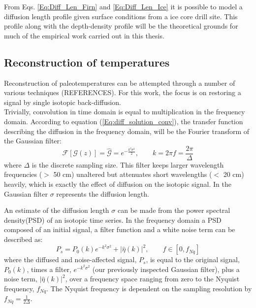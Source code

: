 \documentclass[../../CompleteThesis2/Complete_2ndDraft]{subfiles}
\begin{document}
From Eqs. \ref{Eq:Diff_Len_Firn} and \ref{Eq:Diff_Len_Ice} it is possible to model a diffusion length profile given surface conditions from a ice core drill site. This profile along with the depth-density profile will be the theoretical grounds for much of the empirical work carried out in this thesis.

\subsection{Reconstruction of temperatures}
\label{Subsec:Ice_DiffusionAndDensification_Diffusion_TemperatureRecon}
Reconstruction of paleotemperatures can be attempted through a number of various techniques (REFERENCES). For this work, the focus is on restoring a signal by single isotopic back-diffusion.\\
Trivially, convolution in time domain is equal to multiplication in the frequency domain. According to equation (\ref{Eq:diff_solution_conv}), the transfer function describing the diffusion in the frequency domain, will be the Fourier transform of the Gaussian filter:
\begin{equation}
	\mathcal{F}[\mathcal{G}(z)] = \hat{\mathcal{G}} = e^{-\frac{k^2\sigma^2}{2}}, \qquad k = 2\pi f = \frac{2\pi}{\Delta}
	\label{Eq:Transer_Fct}
\end{equation} 
where $\Delta$ is the discrete sampling size. This filter keeps larger wavelength frequencies ($>$ 50 cm) unaltered but attenuates short wavelengths ($<$ 20 cm) heavily, which is exactly the effect of diffusion on the isotopic signal. In the Gaussian filter $\sigma$ represents the diffusion length.

An estimate of the diffusion length $\sigma$ can be made from the power spectral density(PSD) of an isotopic time series. In the frequency domain a PSD composed of an initial signal, a filter function and a white noise term can be described as:
\begin{equation}
	P_s = P_0(k) e^{-k^2\sigma^2} + |\hat{\eta}(k)|^2, \qquad f \in [0, f_{Nq}]
	\label{Eq:PSD_general}
\end{equation} 
where the diffused and noise-affected signal, $P_s$, is equal to the original signal, $P_0(k)$, times a filter, $e^{-k^2\sigma^2}$ (our previously inspected Gaussian filter), plus a noise term, $|\hat{\eta}(k)|^2$, over a frequency space ranging from zero to the Nyquist frequency, $f_{Nq}$. The Nyquist frequency is dependent on the sampling resolution by $f_{Nq} = \frac{1}{2\Delta}$.
\end{document}
